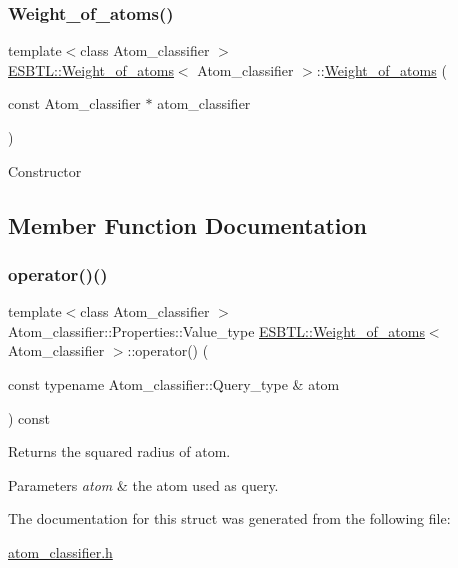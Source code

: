 \subsubsection{\texorpdfstring{Weight\+\_\+of\+\_\+atoms()}{Weight\_of\_atoms()}}
{\footnotesize\ttfamily template$<$class Atom\+\_\+classifier $>$ \\
\hyperlink{structESBTL_1_1Weight__of__atoms}{E\+S\+B\+T\+L\+::\+Weight\+\_\+of\+\_\+atoms}$<$ Atom\+\_\+classifier $>$\+::\hyperlink{structESBTL_1_1Weight__of__atoms}{Weight\+\_\+of\+\_\+atoms} (\begin{DoxyParamCaption}\item[{const Atom\+\_\+classifier $\ast$}]{atom\+\_\+classifier }\end{DoxyParamCaption})\hspace{0.3cm}{\ttfamily [inline]}}

Constructor 

\subsection{Member Function Documentation}
\mbox{\label{structESBTL_1_1Weight__of__atoms_adb65094d02fcf53a86e272c34ded0643}} 
\subsubsection{\texorpdfstring{operator()()}{operator()()}}
{\footnotesize\ttfamily template$<$class Atom\+\_\+classifier $>$ \\
Atom\+\_\+classifier\+::\+Properties\+::\+Value\+\_\+type \hyperlink{structESBTL_1_1Weight__of__atoms}{E\+S\+B\+T\+L\+::\+Weight\+\_\+of\+\_\+atoms}$<$ Atom\+\_\+classifier $>$\+::operator() (\begin{DoxyParamCaption}\item[{const typename Atom\+\_\+classifier\+::\+Query\+\_\+type \&}]{atom }\end{DoxyParamCaption}) const\hspace{0.3cm}{\ttfamily [inline]}}

Returns the squared radius of atom. 
\begin{DoxyParams}{Parameters}
{\em atom} & the atom used as query. \\
\hline
\end{DoxyParams}


The documentation for this struct was generated from the following file\+:\begin{DoxyCompactItemize}
\item 
\hyperlink{atom__classifier_8h}{atom\+\_\+classifier.\+h}\end{DoxyCompactItemize}
